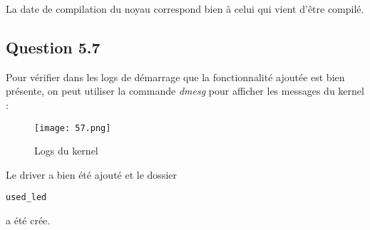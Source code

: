 \documentclass[a4paper,12pt]{report}
\begin{document}
La date de compilation du noyau correspond bien à celui qui vient d'être compilé.



\subsection{Question 5.7}

Pour vérifier dans les logs de démarrage que la fonctionnalité ajoutée est bien présente, on peut utiliser la commande \textit{dmesg} pour afficher les messages du kernel :

\begin{figure}[h]
	\centering
		\texttt{[image: 57.png]}
		\caption{Logs du kernel}
\end{figure}

Le driver a bien été ajouté et le dossier 
\begin{verbatim}
used_led 
\end{verbatim}
a été crée.



\appendix
\end{document}
